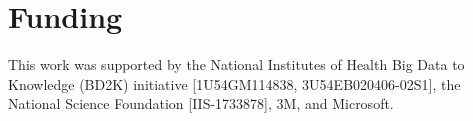 \section*{Funding}

This work was supported by the National Institutes of Health Big Data to Knowledge (BD2K) initiative [1U54GM114838, 3U54EB020406-02S1], the National Science Foundation [IIS-1733878], 3M, and Microsoft.

\vspace*{-12pt}



%





